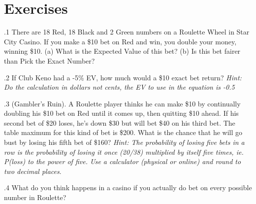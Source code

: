 \section{Exercises}


.1 There are 18 Red, 18 Black and 2 Green numbers on
a Roulette Wheel in Star City Casino. If you make a \$10 bet on Red
and win, you double your money, winning \$10. (a) What is the Expected
Value of this bet? (b) Is this bet fairer than Pick the Exact Number?

.2 If Club Keno had a -5\% EV, how much would a \$10
exact bet return? \textit{Hint: Do the calculation in dollars not
cents, the EV to use in the equation is -0.5}

.3 (Gambler's Ruin). A Roulette player thinks he
can make \$10 by continually doubling his \$10 bet on Red until it
comes up, then quitting \$10 ahead. If his second bet of \$20 loses,
he's down \$30 but will bet \$40 on his third bet. The table maximum
for this kind of bet is \$200. What is the chance that he will go bust
by losing his fifth bet of \$160? \textit{Hint: The probability of
losing five bets in a row is the probability of losing it once (20/38)
multiplied by itself five times, ie. P(loss) to the power of
five. Use a calculator (physical or online) and round to two
decimal places}.

.4 What do you think happens in a casino if you
actually do bet on every possible number in Roulette?
